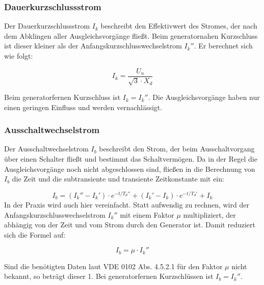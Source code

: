 \documentclass{scrartcl}
\begin{document}
\begin{onehalfspace}
\subsubsection{Dauerkurzschlussstrom}
Der Dauerkurzschlussstrom $I_k$ beschreibt den Effektivwert des Stromes, der nach dem Abklingen aller Ausgleichsvorgänge fließt. Beim generatornahen Kurzschluss ist dieser kleiner als der Anfangskurzschlusswechselstrom $I_k''$. Er berechnet sich wie folgt:

\begin{equation}
I_k = \frac{U_n}{\sqrt{3} \cdot X_d}
\end{equation}

 Beim generatorfernen Kurzschluss ist $I_k = I_k''$. Die Ausgleichsvorgänge haben nur einen geringen Einfluss und werden vernachlässigt.

\subsubsection{Ausschaltwechselstrom}
Der Ausschaltwechselstrom $I_b$ beschreibt den Strom, der beim Ausschaltvorgang über einen Schalter fließt und bestimmt das Schaltvermögen. Da in der Regel die Ausgleichsvorgänge noch nicht abgeschlossen sind, fließen in die Berechnung von $I_b$ die Zeit und die  subtransiente und transiente Zeitkonstante mit ein:

\begin{equation}
I_b = (I_k'' - I_k') \cdot e ^{-t/T_d''} +  (I_k' - I_k) \cdot e ^{-t/T_d'} + I_k
\end{equation}
In der Praxis wird auch hier vereinfacht. Statt aufwendig zu rechnen, wird der Anfangskurzschlusswechselstrom $I_k''$ mit einem Faktor $\mu$ multipliziert, der abhängig von der Zeit und vom Strom durch den Generator ist. Damit reduziert sich die Formel auf:

\begin{equation}
I_b =  \mu \cdot I_k''
\end{equation}

Sind die benötigten Daten laut VDE 0102 Abs. 4.5.2.1 für den Faktor $\mu$ nicht bekannt, so beträgt dieser 1. Bei generatorfernen Kurzschlüssen ist $I_b = I_k''$.



\end{onehalfspace}
\end{document}
